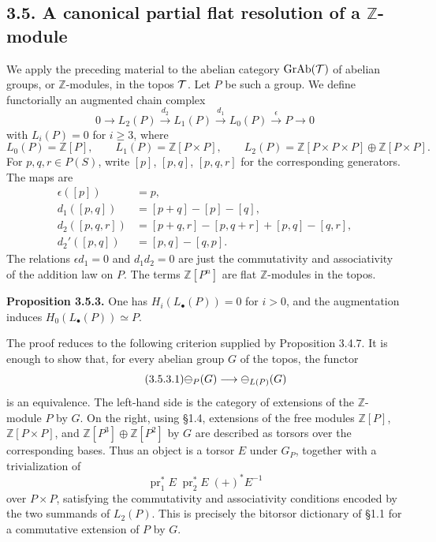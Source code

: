 \documentclass[11pt]{article}
\providecommand{\Z}{\mathbb Z}
\providecommand{\pr}{\operatorname{pr}}
\begin{document}
\subsection*{3.5. A canonical partial flat resolution of a \(\Z\)-module}
We apply the preceding material to the abelian category \(\operatorname{GrAb}(\mathcal T)\) of abelian groups, or \(\Z\)-modules, in the topos \(\mathcal T\).  Let \(P\) be such a group.  We define functorially an augmented chain complex
\begin{equation}\tag{3.5.1}
  0\longrightarrow L_2(P)\xrightarrow{d_2}L_1(P)\xrightarrow{d_1}L_0(P)\xrightarrow{\epsilon}P\longrightarrow0
\end{equation}
with \(L_i(P)=0\) for \(i\geq3\), where
\begin{equation}\tag{3.5.1'}
  L_0(P)=\Z[P],\qquad
  L_1(P)=\Z[P\times P],\qquad
  L_2(P)=\Z[P\times P\times P]\oplus\Z[P\times P].
\end{equation}
For \(p,q,r\in P(S)\), write \([p]\), \([p,q]\), \([p,q,r]\) for the corresponding generators.  The maps are
\begin{align}\tag{3.5.2}
 \epsilon([p])&=p,\\
 d_1([p,q])&=[p+q]-[p]-[q],\\
 d_2([p,q,r])&=[p+q,r]-[p,q+r]+[p,q]-[q,r],\\
 d_2'([p,q])&=[p,q]-[q,p].
\end{align}
The relations \(\epsilon d_1=0\) and \(d_1 d_2=0\) are just the commutativity and associativity of the addition law on \(P\).  The terms \(\Z[P^n]\) are flat \(\Z\)-modules in the topos.

\textbf{Proposition 3.5.3.}  One has \(H_i(L_\bullet(P))=0\) for \(i>0\), and the augmentation induces \(H_0(L_\bullet(P))\simeq P\).

The proof reduces to the following criterion supplied by Proposition 3.4.7.  It is enough to show that, for every abelian group \(G\) of the topos, the functor
\begin{equation}\tag{3.5.3.1}
  \mathcal\Psi_P(G)\longrightarrow \mathcal\Psi_{L(P)}(G)
\end{equation}
is an equivalence.  The left-hand side is the category of extensions of the \(\Z\)-module \(P\) by \(G\).  On the right, using \S1.4, extensions of the free modules \(\Z[P]\), \(\Z[P\times P]\), and \(\Z[P^3]\oplus\Z[P^2]\) by \(G\) are described as torsors over the corresponding bases.  Thus an object is a torsor \(E\) under \(G_P\), together with a trivialization of
\begin{equation}\tag{3.5.3.2}
  \pr_1^*E\;\pr_2^*E\;(+)^*E^{-1}
\end{equation}
over \(P\times P\), satisfying the commutativity and associativity conditions encoded by the two summands of \(L_2(P)\).  This is precisely the bitorsor dictionary of \S1.1 for a commutative extension of \(P\) by \(G\).
\end{document}
